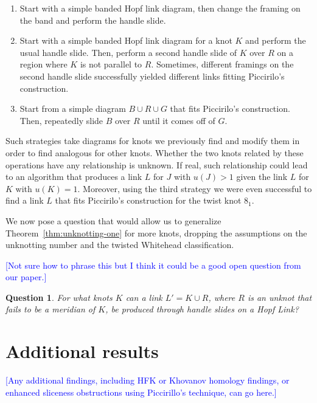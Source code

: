\documentclass[11pt,usenames,dvipsnames,reqno]{amsart}
\numberwithin{theorem}{section}
\newtheorem{question}[theorem]{Question}
\theoremstyle{ex}
\theoremstyle{rem}
\def\kh#1{\textcolor{Blue}{#1}}
\begin{document}
\begin{enumerate}
	\item Start with a simple banded Hopf link diagram, then change the framing on the band and perform the handle slide.
	\item Start with a simple banded Hopf link diagram for a knot $K$ and perform the usual handle slide. Then, perform a second handle slide of $K$ over $R$ on a region where $K$ is not parallel to $R$. Sometimes, different framings on the second handle slide successfully yielded different links fitting Piccirilo's construction.
	\item Start from a simple diagram $B \cup R \cup G$ that fits Piccirilo's construction. Then, repeatedly slide $B$ over $R$ until it comes off of $G$.
\end{enumerate}

Such strategies take diagrams for knots we previously find and modify them in order to find analogous for other knots. Whether the two knots related by these operations have any relationship is unknown. If real, such relationship could lead to an algorithm that produces a link $L$ for $J$ with $u(J) > 1$ given the link $L$ for $K$ with $u(K) = 1$. Moreover, using the third strategy we were even successful to find a link $L$ that fits Piccirilo's construction for the twist knot $8_1$.

We now pose a question that would allow us to generalize Theorem~\ref{thm:unknotting-one} for more knots, dropping the assumptions on the unknotting number and the twisted Whitehead classification.

\kh{[Not sure how to phrase this but I think it could be a good open question from our paper.]}
\begin{question}
	For what knots $K$ can a link $L' = K \cup R$, where $R$ is an unknot that fails to be a meridian of $K$, be produced through handle slides on a Hopf Link?
\end{question}

\section{Additional results}

\kh{[Any additional findings, including HFK or Khovanov homology findings, or enhanced sliceness obstructions using Piccirillo's technique, can go here.]}




\end{document}
